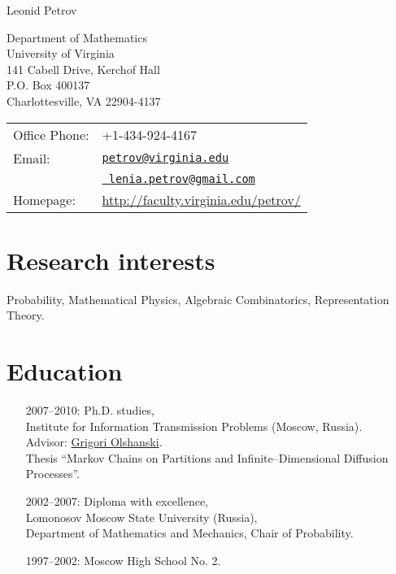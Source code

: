 \documentclass[letterpaper,11pt]{article}
\def\name{Leonid Petrov}
\begin{document}
{\huge \name}


\vspace{0.25in}

\begin{minipage}{0.45\linewidth}
	Department of Mathematics\\
	University of Virginia\\
	141 Cabell Drive, Kerchof Hall\\
	P.O. Box 400137\\
	Charlottesville, VA 22904-4137
\end{minipage}
\begin{minipage}{0.45\linewidth}
	\begin{tabular}{ll}
		Office Phone: & +1-434-924-4167                           \\
		Email:        &
		\href{mailto:petrov@virginia.edu}{\tt petrov@virginia.edu}\\&
		\href{mailto:lenia.petrov@gmail.com}{\tt
			lenia.petrov@gmail.com}
		\\
		Homepage:     & \url{http://faculty.virginia.edu/petrov/} \\
	\end{tabular}
\end{minipage}

\section*{Research interests}

Probability, Mathematical Physics, Algebraic Combinatorics, Representation
Theory.

\section*{Education}

\begin{itemize}
	\item
	      [2007--2010:]
	      Ph.D. studies,\\Institute for Information Transmission Problems
	      (Moscow,
	      Russia).
	      \\
	      Advisor: \href{http://www.iitp.ru/en/userpages/88/}{Grigori
		      Olshanski}.\\
	      Thesis ``Markov Chains on Partitions and Infinite--Dimensional
	      Diffusion
	      Processes''.

	\item
	      [2002--2007:]
	      Diploma with excellence,\\
	      Lomonosov Moscow State University (Russia),\\ Department of
	      Mathematics and
	      Mechanics, Chair of Probability.

	\item
	      [1997--2002:] Moscow High School No. 2.

\end{itemize}
\end{document}
